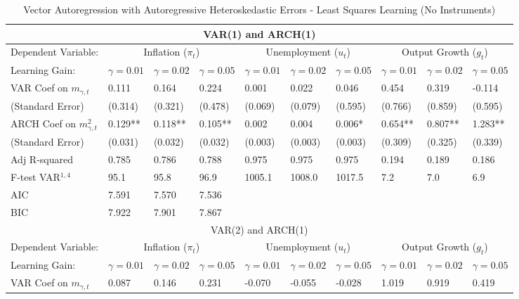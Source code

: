 \documentclass[12pt]{article}
\begin{document}
\begin{table}\caption{Vector Autoregression with Autoregressive Heteroskedastic Errors - Least Squares Learning (No Instruments)}\label{tb:varls}
\begin{small}\begin{center}
\begin{tabular}{l|p{0.64in} p{0.64in} p{0.64in}|p{0.64in} p{0.64in} p{0.64in}|p{0.64in} p{0.64in} p{0.64in}}\hline
\multicolumn{10}{c}{VAR(1) and ARCH(1)} \\ \hline \hline
Dependent Variable:  & \multicolumn{3}{c|}{Inflation ($\pi_t$)} & \multicolumn{3}{c|}{Unemployment ($u_t$)} &  \multicolumn{3}{c}{Output Growth ($g_t$)} \\ \hline
Learning Gain: & $\gamma=0.01$ & $\gamma=0.02$ & $\gamma=0.05$ & $\gamma=0.01$ & $\gamma=0.02$ & $\gamma=0.05$& $\gamma=0.01$ & $\gamma=0.02$ & $\gamma=0.05$ \\ \hline
VAR Coef on $m_{\gamma,t}$ & 0.111 & 0.164 & 0.224 & 0.001 & 0.022 & 0.046 & 0.454 & 0.319 & -0.114 \\
(Standard Error) & (0.314) & (0.321) & (0.478) & (0.069) & (0.079) & (0.595) & (0.766) & (0.859) & (0.595) \\ \hline
ARCH Coef on $m_{\gamma,t}^2$ & 0.129** & 0.118** & 0.105** & 0.002 & 0.004 & 0.006* & 0.654** & 0.807** & 1.283** \\
(Standard Error) & (0.031) & (0.032) & (0.032) & (0.003) & (0.003) & (0.003) & (0.309) & (0.325) & (0.339) \\ \hline
Adj R-squared & 0.785 & 0.786 & 0.788 & 0.975 & 0.975 & 0.975 & 0.194 & 0.189 & 0.186 \\ 
F-test VAR$^{1,4}$ & 95.1 & 95.8 & 96.9 & 1005.1 & 1008.0 & 1017.5 & 7.2 & 7.0 & 6.9 \\ 
AIC & 7.591 & 7.570 & 7.536   & & &   & & & \\ 
BIC & 7.922 & 7.901 & 7.867   & & &   & & & \\ \hline \hline
\multicolumn{10}{c}{VAR(2) and ARCH(1)} \\ \hline \hline
Dependent Variable:  & \multicolumn{3}{c|}{Inflation ($\pi_t$)} & \multicolumn{3}{c|}{Unemployment ($u_t$)} &  \multicolumn{3}{c}{Output Growth ($g_t$)} \\ \hline
Learning Gain: & $\gamma=0.01$ & $\gamma=0.02$ & $\gamma=0.05$ & $\gamma=0.01$ & $\gamma=0.02$ & $\gamma=0.05$& $\gamma=0.01$ & $\gamma=0.02$ & $\gamma=0.05$ \\ \hline
VAR Coef on $m_{\gamma,t}$ & 0.087 & 0.146 & 0.231 & -0.070 & -0.055 & -0.028 & 1.019 & 0.919 & 0.419 \\

\end{tabular}
\end{center}
\end{small}
\end{table}
\end{document}
